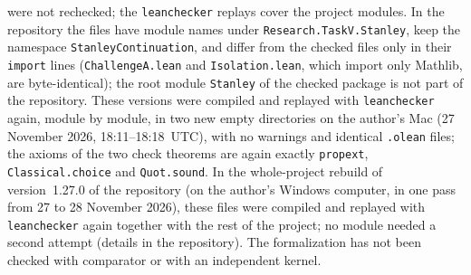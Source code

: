 \documentclass[11pt]{article}
\theoremstyle{definition}
\theoremstyle{remark}
\newcommand{\repoversion}{1.27.0}
\begin{document}
{were not rechecked; the \texttt{leanchecker} replays cover the project modules.
In the repository the files have module names under
\texttt{Research.TaskV.Stanley}, keep the namespace \texttt{StanleyContinuation},
and differ from the checked files only in their \texttt{import} lines
(\texttt{ChallengeA.lean} and \texttt{Isolation.lean}, which import only Mathlib,
are byte-identical); the root module \texttt{Stanley} of the checked package is
not part of the repository.
These versions were compiled and replayed with \texttt{leanchecker} again, module by module, in two new empty directories on the author's Mac (27 November 2026, 18:11--18:18~UTC), with no warnings and identical \texttt{.olean} files; the axioms of the two check theorems are again exactly \texttt{propext}, \texttt{Classical.choice} and \texttt{Quot.sound}.
In the whole-project rebuild of version~\repoversion{} of the repository (on the author's Windows computer, in one pass from 27 to 28 November 2026), these files were compiled and replayed with \texttt{leanchecker} again together with the rest of the project; no module needed a second attempt (details in the repository). The formalization has not been checked with comparator or with an
independent kernel.

\par}
\end{document}
